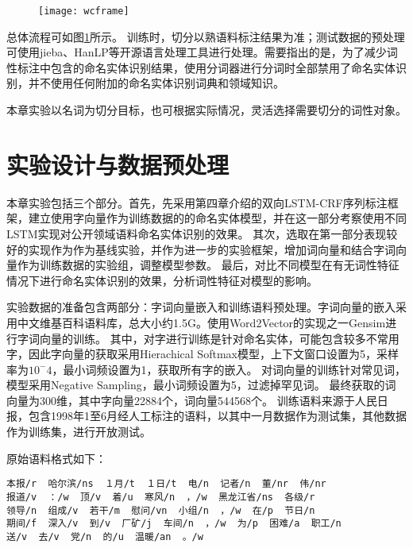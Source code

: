 \begin{figure}[H]
    \centering
    \texttt{[image: wcframe]}
    \label{fig:exp_frame}
\end{figure}

总体流程可如图\ref{fig:exp_frame}所示。
训练时，切分以熟语料标注结果为准；测试数据的预处理可使用jieba、HanLP等开源语言处理工具进行处理。需要指出的是，为了减少词性标注中包含的命名实体识别结果，使用分词器进行分词时全部禁用了命名实体识别，并不使用任何附加的命名实体识别词典和领域知识。

本章实验以名词为切分目标，也可根据实际情况，灵活选择需要切分的词性对象。

\section{实验设计与数据预处理}
本章实验包括三个部分。首先，先采用第四章介绍的双向LSTM-CRF序列标注框架，建立使用字向量作为训练数据的的命名实体模型，并在这一部分考察使用不同LSTM实现对公开领域语料命名实体识别的效果。
其次，选取在第一部分表现较好的实现作为作为基线实验，并作为进一步的实验框架，增加词向量和结合字词向量作为训练数据的实验组，调整模型参数。
最后，对比不同模型在有无词性特征情况下进行命名实体识别的效果，分析词性特征对模型的影响。


实验数据的准备包含两部分：字词向量嵌入和训练语料预处理。字词向量的嵌入采用中文维基百科语料库，总大小约1.5G。使用Word2Vector的实现之一Gensim进行字词向量的训练。
其中，对字进行训练是针对命名实体，可能包含较多不常用字，因此字向量的获取采用Hierachical Softmax模型，上下文窗口设置为5，采样率为$10^-4$，最小词频设置为1，获取所有字的嵌入。
对词向量的训练针对常见词，模型采用Negative Sampling，最小词频设置为5，过滤掉罕见词。
最终获取的词向量为300维，其中字向量22884个，词向量544568个。
训练语料来源于人民日报，包含1998年1至6月经人工标注的语料，以其中一月数据作为测试集，其他数据作为训练集，进行开放测试。

原始语料格式如下：

\begin{verbatim}
本报/r  哈尔滨/ns  １月/t  １日/t  电/n  记者/n  董/nr  伟/nr
报道/v  ：/w  顶/v  着/u  寒风/n  ，/w  黑龙江省/ns  各级/r
领导/n  组成/v  若干/m  慰问/vn  小组/n  ，/w  在/p  节日/n
期间/f  深入/v  到/v  厂矿/j  车间/n  ，/w  为/p  困难/a  职工/n
送/v  去/v  党/n  的/u  温暖/an  。/w
\end{verbatim}

